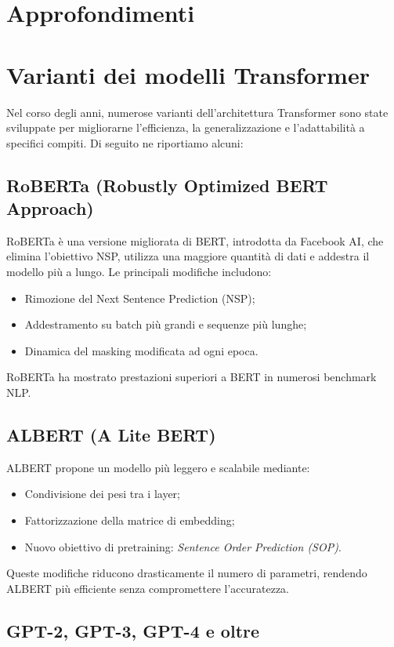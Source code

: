 \section*{Approfondimenti}
\section{Varianti dei modelli Transformer}

Nel corso degli anni, numerose varianti dell’architettura Transformer sono state sviluppate per migliorarne l’efficienza, la generalizzazione e l’adattabilità a specifici compiti. Di seguito ne riportiamo alcuni:

\subsection{RoBERTa (Robustly Optimized BERT Approach)}

RoBERTa è una versione migliorata di BERT, introdotta da Facebook AI, che elimina l’obiettivo NSP, utilizza una maggiore quantità di dati e addestra il modello più a lungo. Le principali modifiche includono:
\begin{itemize}
    \item Rimozione del Next Sentence Prediction (NSP);
    \item Addestramento su batch più grandi e sequenze più lunghe;
    \item Dinamica del masking modificata ad ogni epoca.
\end{itemize}
RoBERTa ha mostrato prestazioni superiori a BERT in numerosi benchmark NLP.

\subsection{ALBERT (A Lite BERT)}

ALBERT propone un modello più leggero e scalabile mediante:
\begin{itemize}
    \item Condivisione dei pesi tra i layer;
    \item Fattorizzazione della matrice di embedding;
    \item Nuovo obiettivo di pretraining: \textit{Sentence Order Prediction (SOP)}.
\end{itemize}
Queste modifiche riducono drasticamente il numero di parametri, rendendo ALBERT più efficiente senza compromettere l’accuratezza.

\subsection{GPT-2, GPT-3, GPT-4 e oltre}

